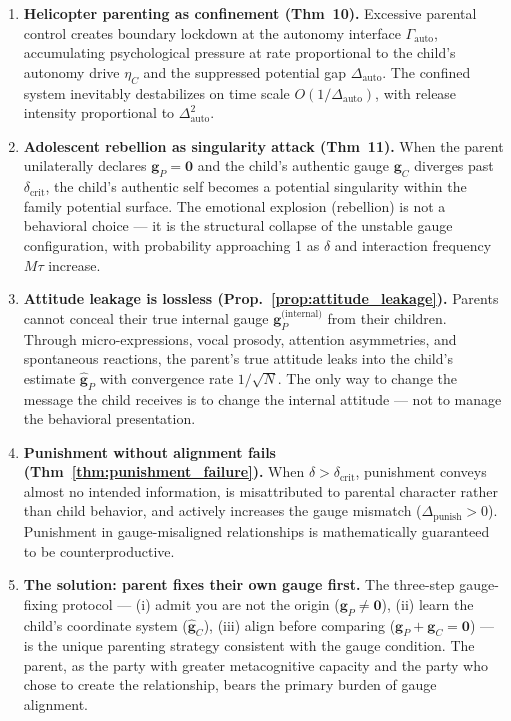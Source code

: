 \documentclass[11pt,a4paper]{article}
\begin{document}
\begin{enumerate}[label=(\arabic*)]
    \item \textbf{Helicopter parenting as confinement (Thm~10).} Excessive parental control creates boundary lockdown at the autonomy interface $\Gamma_{\text{auto}}$, accumulating psychological pressure at rate proportional to the child's autonomy drive $\eta_C$ and the suppressed potential gap $\Delta_{\text{auto}}$. The confined system inevitably destabilizes on time scale $O(1/\Delta_{\text{auto}})$, with release intensity proportional to $\Delta_{\text{auto}}^2$.

    \item \textbf{Adolescent rebellion as singularity attack (Thm~11).} When the parent unilaterally declares $\mathbf{g}_P = \mathbf{0}$ and the child's authentic gauge $\mathbf{g}_C$ diverges past $\delta_{\text{crit}}$, the child's authentic self becomes a potential singularity within the family potential surface. The emotional explosion (rebellion) is not a behavioral choice — it is the structural collapse of the unstable gauge configuration, with probability approaching 1 as $\delta$ and interaction frequency $M\tau$ increase.

    \item \textbf{Attitude leakage is lossless (Prop.~\ref{prop:attitude_leakage}).} Parents cannot conceal their true internal gauge $\mathbf{g}_P^{\text{(internal)}}$ from their children. Through micro-expressions, vocal prosody, attention asymmetries, and spontaneous reactions, the parent's true attitude leaks into the child's estimate $\hat{\mathbf{g}}_P$ with convergence rate $1/\sqrt{N}$. The only way to change the message the child receives is to change the internal attitude — not to manage the behavioral presentation.

    \item \textbf{Punishment without alignment fails (Thm~\ref{thm:punishment_failure}).} When $\delta > \delta_{\text{crit}}$, punishment conveys almost no intended information, is misattributed to parental character rather than child behavior, and actively increases the gauge mismatch ($\Delta_{\text{punish}} > 0$). Punishment in gauge-misaligned relationships is mathematically guaranteed to be counterproductive.

    \item \textbf{The solution: parent fixes their own gauge first.} The three-step gauge-fixing protocol — (i) admit you are not the origin ($\mathbf{g}_P \neq \mathbf{0}$), (ii) learn the child's coordinate system ($\hat{\mathbf{g}}_C$), (iii) align before comparing ($\mathbf{g}_P + \mathbf{g}_C = \mathbf{0}$) — is the unique parenting strategy consistent with the gauge condition. The parent, as the party with greater metacognitive capacity and the party who chose to create the relationship, bears the primary burden of gauge alignment.
\end{enumerate}
\end{document}
